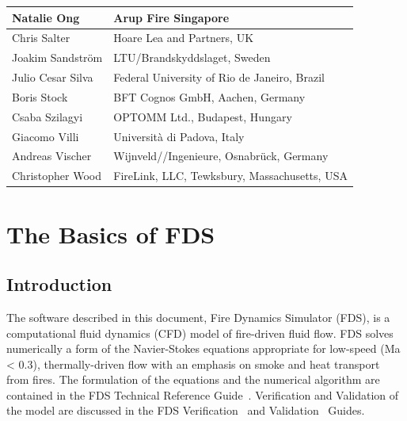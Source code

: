 \documentclass[11pt]{book}
\begin{document}
\begin{longtable}{|l|l|}
Natalie Ong                             & Arup Fire Singapore                                                       \\ \hline
Chris Salter                            & Hoare Lea and Partners, UK                                                \\ \hline
Joakim Sandstr\"{o}m                    & LTU/Brandskyddslaget, Sweden                                              \\ \hline
Julio Cesar Silva                       & Federal University of Rio de Janeiro, Brazil                              \\ \hline
Boris Stock                             & BFT Cognos GmbH, Aachen, Germany                                          \\ \hline
Csaba Szilagyi                          & OPTOMM Ltd., Budapest, Hungary                                            \\ \hline
Giacomo Villi                           & Universit\`{a} di Padova, Italy                                           \\ \hline
Andreas Vischer                         & Wijnveld//Ingenieure, Osnabr\"{u}ck, Germany                              \\ \hline
Christopher Wood                        & FireLink, LLC, Tewksbury, Massachusetts, USA                              \\ \hline
\end{longtable}

\cleardoublepage
{}
{}
\tableofcontents

\cleardoublepage
{}
{}
\listoffigures

\cleardoublepage
{}
{}
\listoftables


\mainmatter



\part{The Basics of FDS}


\chapter{Introduction}

The software described in this document, Fire Dynamics Simulator (FDS), is a computational
fluid dynamics (CFD) model of fire-driven fluid flow. FDS solves numerically a form of the
Navier-Stokes equations appropriate for low-speed (Ma < 0.3), thermally-driven flow
with an emphasis on smoke and heat transport from fires.
The formulation of the equations and the numerical algorithm are contained in the FDS Technical Reference Guide~\cite{FDS_Math_Guide}.
Verification and Validation of the model are discussed in the FDS Verification~\cite{FDS_Verification_Guide} and Validation~\cite{FDS_Validation_Guide} Guides.
\end{document}
